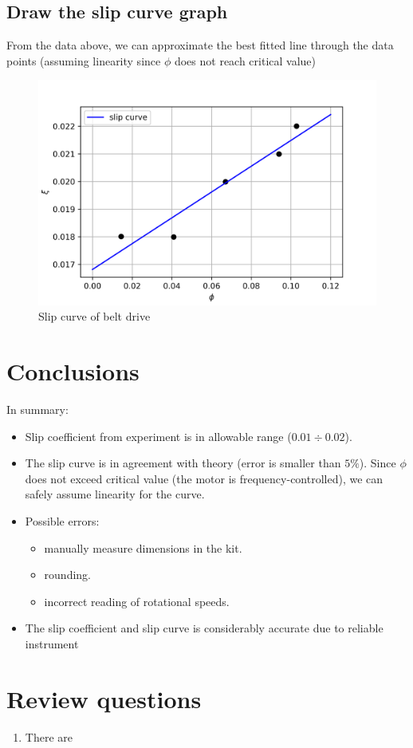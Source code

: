 \subsection{Draw the slip curve graph}
From the data above, we can approximate the best fitted line through the data points (assuming linearity since $ \phi $ does not reach critical value)
\begin{figure}[ht]
	\centering
	\includegraphics{Exp1.png}
	\caption{Slip curve of belt drive}
\end{figure}

\section{Conclusions}
In summary:
\begin{itemize}
	\item Slip coefficient from experiment is in allowable range ($ 0.01\div0.02 $).
	\item The slip curve is in agreement with theory (error is smaller than $ 5\% $). Since $ \phi $ does not exceed critical value (the motor is frequency-controlled), we can safely assume linearity for the curve.
	\item Possible errors:
	\begin{itemize}
		\item manually measure dimensions in the kit.
		\item rounding.
		\item incorrect reading of rotational speeds.
	\end{itemize}
	\item The slip coefficient and slip curve is considerably accurate due to reliable instrument
\end{itemize}
\section{Review questions}
\begin{enumerate}
	\item There are 
\end{enumerate}